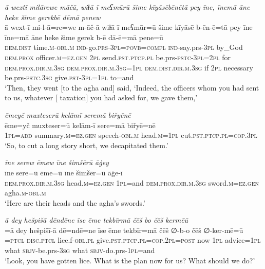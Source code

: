 \ea \label{BP.124}
\textit{ā wextī milārewe māčā, wiɫā ī meʕmūrū šime kīyāsēbēnētā pey īne, īnemā āne heke šime gerekbē dēmā penew} \\ 
\gll ā wext-ī mi-l-ā=re=we m-āč-ā wiɫā ī meʕmūr=ū šime kīyāsē b-ēn-ē=tā pey īne īne=mā āne heke šime gerek b-ē dā-ē=mā pene=ū \\ 
 \textsc{dem.dist} time\textsc{.m}\textsc{-obl}\textsc{.m} \textsc{ind-}go.\textsc{prs}\textsc{-3pl}\textsc{=\textsc{povb}}\textsc{=compl} \textsc{ind-}say.prs\textsc{-3pl} by\_God \textsc{dem.prox} officer\textsc{.m}\textsc{=ez.gen} \textsc{2pl} send\textsc{.pst}\textsc{.ptcp}\textsc{.pl} be.prs\textsc{-pstc}\textsc{-3pl}=\textsc{2pl} for \textsc{dem.prox}\textsc{.dir}\textsc{.m}\textsc{.3sg} \textsc{dem.prox}\textsc{.dir}\textsc{.m}\textsc{.3sg}\textsc{=\textsc{1pl}} \textsc{dem.dist}\textsc{.dir}\textsc{.m}\textsc{.3sg} if \textsc{2pl} necessary be.prs\textsc{-pstc}\textsc{.3sg} give\textsc{.pst}\textsc{-3pl}\textsc{=\textsc{1pl}} to=and \\ 
\glt `Then, they went [to the agha and] said, ‘Indeed, the officers whom you had sent to us, whatever [ taxation] you had asked for, we gave them,'
\z 
 
\ea \label{BP.127}
\textit{ēmeyč muxteserū kelāmī seremā biřyēnē} \\ 
\gll ēme=yč muxteser=ū kelām-ī sere=mā biřyē=nē \\ 
 \textsc{1pl}\textsc{=add} summary\textsc{.m}\textsc{=ez.gen} speech\textsc{-obl}\textsc{.m} head\textsc{.m}\textsc{=\textsc{1pl}} cut\textsc{.pst}\textsc{.ptcp}\textsc{.pl}\textsc{=cop}\textsc{.3pl} \\ 
\glt `So, to cut a long story short, we decapitated them.'
\z 
 
\ea \label{BP.128}
\textit{īne serew ēmew īne šimšērū āġey} \\ 
\gll īne sere=ū ēme=ū īne šimšēr=ū āġe-ī \\ 
 \textsc{dem.prox}\textsc{.dir}\textsc{.m}\textsc{.3sg} head\textsc{.m}\textsc{=ez.gen} \textsc{1pl}=and \textsc{dem.prox}\textsc{.dir}\textsc{.m}\textsc{.3sg} sword\textsc{.m}\textsc{=ez.gen} agha\textsc{.m}\textsc{-obl}\textsc{.m} \\ 
\glt `Here are their heads and the agha’s swords.'
\z 
 
\ea \label{BP.156}
\textit{ā dey hešpišā dēndēne īse ēme tekbīrmā čēš bo čēš kermēū} \\ 
\gll =ā dey hešpišī-ā dē=ndē=ne īse ēme tekbīr=mā čēš ∅-b-o čēš ∅-ker-mē=ū \\ 
=\textsc{ptcl} \textsc{disc.ptcl} lice.f\textsc{-obl}\textsc{.pl} give\textsc{.pst}\textsc{.ptcp}\textsc{.pl}\textsc{=cop}.\textsc{2pl}\textsc{=\textsc{post}} now \textsc{1pl} advice\textsc{=\textsc{1pl}} what \textsc{sbjv-}be.prs\textsc{-3sg} what \textsc{sbjv-}do.prs\textsc{-\textsc{1pl}}=and \\ 
\glt `Look, you have gotten lice. What is the plan now for us? What should we do?'
\z 
 
